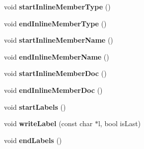 \begin{DoxyCompactItemize}
\item 
\mbox{\label{class_html_generator_ad8d74d63c27a79721411b61f079b1d23}} 
void {\bfseries start\+Inline\+Member\+Type} ()
\item 
\mbox{\label{class_html_generator_abf118ca2952e998a7bf92872cbd27d78}} 
void {\bfseries end\+Inline\+Member\+Type} ()
\item 
\mbox{\label{class_html_generator_aea75d506f4ee65a94d2d168de6bd9344}} 
void {\bfseries start\+Inline\+Member\+Name} ()
\item 
\mbox{\label{class_html_generator_a696f93dbb5aa57ed49c272049cff3bb2}} 
void {\bfseries end\+Inline\+Member\+Name} ()
\item 
\mbox{\label{class_html_generator_aba254fc8b8e76527e995671a36619228}} 
void {\bfseries start\+Inline\+Member\+Doc} ()
\item 
\mbox{\label{class_html_generator_aa746fa4cf5bc3c2708a549b2fa4a4e78}} 
void {\bfseries end\+Inline\+Member\+Doc} ()
\item 
\mbox{\label{class_html_generator_a117a5517c516573c07e780c560651619}} 
void {\bfseries start\+Labels} ()
\item 
\mbox{\label{class_html_generator_a76009494c2f987f8a95cb79f0fc80250}} 
void {\bfseries write\+Label} (const char $\ast$l, bool is\+Last)
\item 
\mbox{\label{class_html_generator_a4a2190f8892cd76339ee7fcd827e48fc}} 
void {\bfseries end\+Labels} ()
\end{DoxyCompactItemize}
